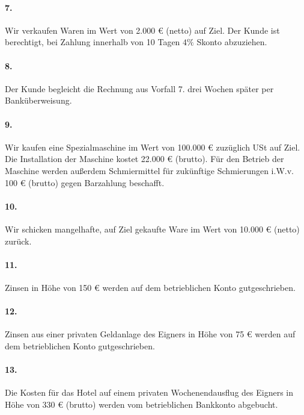 \documentclass[paper=a4, fontsize=11pt]{scrartcl}
\numberwithin{equation}{section}
\numberwithin{figure}{section}
\numberwithin{table}{section}
\begin{document}
{\paragraph{7.}
Wir verkaufen Waren im Wert von 2.000 € (netto) auf Ziel. Der Kunde ist berechtigt, bei Zahlung innerhalb von 10 Tagen $4 \%$ Skonto abzuziehen. \\

\paragraph{8.}
Der Kunde begleicht die Rechnung aus Vorfall 7. drei Wochen später per Banküberweisung. \\

\paragraph{9.}
Wir kaufen eine Spezialmaschine im Wert von 100.000 € zuzüglich USt auf Ziel. Die Installation der Maschine kostet 22.000 € (brutto). Für den Betrieb der Maschine werden außerdem Schmiermittel für zukünftige Schmierungen i.W.v. 100 € (brutto) gegen Barzahlung beschafft. \\

\paragraph{10.}
Wir schicken mangelhafte, auf Ziel gekaufte Ware im Wert von 10.000 € (netto) zurück. \\

\paragraph{11.}
Zinsen in Höhe von 150 € werden auf dem betrieblichen Konto gutgeschrieben. \\

\paragraph{12.}
Zinsen aus einer privaten Geldanlage des Eigners in Höhe von 75 € werden auf dem betrieblichen Konto gutgeschrieben. \\

\paragraph{13.}
Die Kosten für das Hotel auf einem privaten Wochenendausflug des Eigners in Höhe von 330 € (brutto) werden vom betrieblichen Bankkonto abgebucht. \\

}
\end{document}
